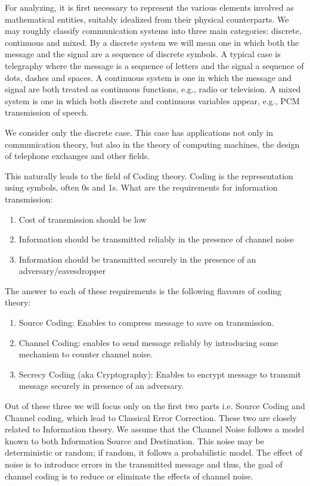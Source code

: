 \documentclass[12pt, oneside]{book}
\theoremstyle{definition}
\theoremstyle{definition}
\theoremstyle{remark}
\begin{document}
 For analyzing, it is first necessary to represent the various elements involved as mathematical entities, suitably idealized from their physical counterparts. We may roughly classify communication systems into three main categories: discrete, continuous and mixed. By a discrete system we will mean one in which both the message and the signal are a sequence of discrete symbols. A typical case is telegraphy where the message is a sequence of letters and the signal a sequence of dots, dashes and spaces. A continuous system is one in which the message and signal are both treated as continuous functions, e.g., radio or television. A mixed system is one in which both discrete and continuous variables appear, e.g., PCM transmission of speech. 

We consider only the discrete case. This case has applications not only in communication theory, but also in the theory of computing machines, the design of telephone exchanges and other fields.

This naturally leads to the field of Coding theory. Coding is the representation using symbols, often 0s and 1s. What are the requirements for information transmission:
\begin{enumerate}
    \item Cost of transmission should be low
    \item Information should be transmitted reliably in the presence of channel noise
    \item Information should be transmitted securely in the presence of an adversary/eavesdropper
\end{enumerate}
The answer to each of these requirements is the following flavours of coding theory:
\begin{enumerate}
    \item Source Coding: Enables to compress message to save on transmission.
    \item Channel Coding: enables to send message reliably by introducing some mechanism to counter channel noise.
    \item Secrecy Coding (aka Cryptography): Enables to encrypt message to transmit message securely in presence of an adversary.
\end{enumerate}

Out of these three we will focus only on the first two parts i.e. Source Coding and Channel coding, which lead to Classical Error Correction. These two are closely related to Information theory. We assume that the Channel Noise follows a model known to both Information Source and Destination. This noise may be deterministic or random; if random, it follows a probabilistic model. The effect of noise is to introduce errors in the transmitted message and thus, the goal of channel coding is to reduce or eliminate the effects of channel noise.
\end{document}
